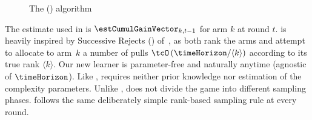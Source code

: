 \begin{figure}[H]
	\centering
	\caption{The \ProbabilityONE{} (\Pone{}) algorithm}\label{fig:probaoneAlgo}
\end{figure}
\noindent
The estimate used in \Pone{} is 
$\estCumulGainVector_{k,t-1}$ for arm $k$ at round $t$. 
\Pone{} is heavily inspired  by Successive Rejects (\SR{}) of~\citet{Audibert10BA}, as both rank the
arms and attempt to allocate to arm~$k$ a number of pulls 
$\tcO\left( \timeHorizon/\langle k\rangle\right)$ according to its true rank $\langle k\rangle$. 
Our new learner is parameter-free and naturally anytime 
(agnostic of $\timeHorizon$).
Like \SR{}, \Pone{} requires neither prior knowledge
nor estimation of the complexity parameters. 
Unlike \SR{}, \Pone{} does not divide the game into different 
sampling phases. \Pone{} follows the same deliberately simple rank-based
sampling rule at every round. %



